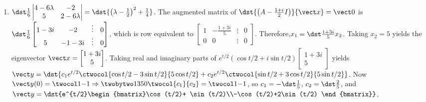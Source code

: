 \documentclass[openany]{book}
\newenvironment{sectionSolutions}{
 \begin{enumerate}[item-label={\thesection.\arabic{enumi}.}]
}{
 \end{enumerate}
}
\begin{document}
\begin{sectionSolutions}
\item
$\dst\frac{1}{6}\begin{vmatrix}4-6\lambda&-2\\5&2-6\lambda
\end{vmatrix}=\dst{\left(\lambda-\frac{1}{2}\right)^2+\frac{1}{4}}$.
The augmented matrix of
$\dst{\left(A-\frac{1+i}{2}I\right)}{\vect x}={\vect 0}$ is
$\dst\frac{1}{6}\begin{bmatrix}1-3i&-2&\vdots&0\\5&-1-3i&\vdots&0
\end{bmatrix}$, which is row equivalent to
$\begin{bmatrix} 1&-\frac{1+3i}{5}&\vdots&0\\ 0&0&\vdots&0
\end{bmatrix}$. Therefore,$x_1=\dst\frac{1+3i}{5}x_2$. Taking
$x_2=5$ yields the eigenvector
${\vect x}=\begin{bmatrix}1+3i\\5\end{bmatrix}$.
 Taking real and imaginary parts of
$e^{t/2}(\cos t/2+i\sin
t/2)\begin{bmatrix}1+3i\\5\end{bmatrix}$
yields ${\vect y}=\dst{c_1e^{t/2}\ctwocol{\cos t/2-3\sin t/2}{5\cos t/2}
+c_2e^{t/2}\ctwocol{\sin t/2+3\cos t/2}{5\sin t/2}}$. Now ${\vect
y}(0)=\twocol1{-1}\Rightarrow
\twobytwo1350\twocol{c_1}{c_2}=\twocol1{-1}$, so
$c_1=-\dst\frac{1}{5}$,
$c_2=\dst\frac{2}{5}$, and
${\vect y}=\dst{e^{t/2}\begin{bmatrix}\cos(t/2)+
\sin(t/2)\\-\cos(t/2)+2\sin(t/2)
\end{bmatrix}}$.



\end{sectionSolutions}
\end{document}
